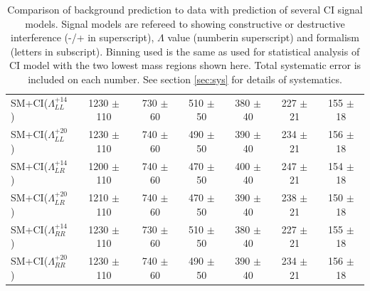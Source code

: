 \begin {table}[h]
\begin{center}
\begin{tabular}{  l | c c c | c c c  }
			SM+CI($\Lambda^{+14}_{LL}$) & 1230 $\pm$ 110 & 730 $\pm$ 60 & 510 $\pm$ 50 & 380 $\pm$ 40 & 227 $\pm$ 21 & 155 $\pm$ 18 \\
			SM+CI($\Lambda^{+20}_{LL}$) & 1230 $\pm$ 110 & 740 $\pm$ 60 & 490 $\pm$ 50 & 390 $\pm$ 40 & 234 $\pm$ 21 & 156 $\pm$ 18 \\
			SM+CI($\Lambda^{+14}_{LR}$) & 1200 $\pm$ 110 & 740 $\pm$ 60 & 470 $\pm$ 50 & 400 $\pm$ 40 & 247 $\pm$ 21 & 154 $\pm$ 18 \\
			SM+CI($\Lambda^{+20}_{LR}$) & 1210 $\pm$ 110 & 740 $\pm$ 60 & 470 $\pm$ 50 & 390 $\pm$ 40 & 238 $\pm$ 21 & 150 $\pm$ 18 \\
			SM+CI($\Lambda^{+14}_{RR}$) & 1230 $\pm$ 110 & 730 $\pm$ 60 & 510 $\pm$ 50 & 380 $\pm$ 40 & 227 $\pm$ 21 & 155 $\pm$ 18 \\
			SM+CI($\Lambda^{+20}_{RR}$) & 1230 $\pm$ 110 & 740 $\pm$ 60 & 490 $\pm$ 50 & 390 $\pm$ 40 & 234 $\pm$ 21 & 156 $\pm$ 18 \\
			\hline
			\hline
		\end{tabular}
	  	\caption{Comparison of background prediction to data with prediction of several CI signal models. Signal models are refereed to showing constructive or destructive interference (-/+ in superscript), $\Lambda$ value (numberin superscript) and formalism (letters in subscript). Binning used is the same as used for statistical analysis of CI model with the two lowest mass regions shown here. Total systematic error is included on each number. See section \ref{sec:sys} for details of systematics.}
	  	\label{tab:CI_results1}
	  	\end{center}
	\end {table}

